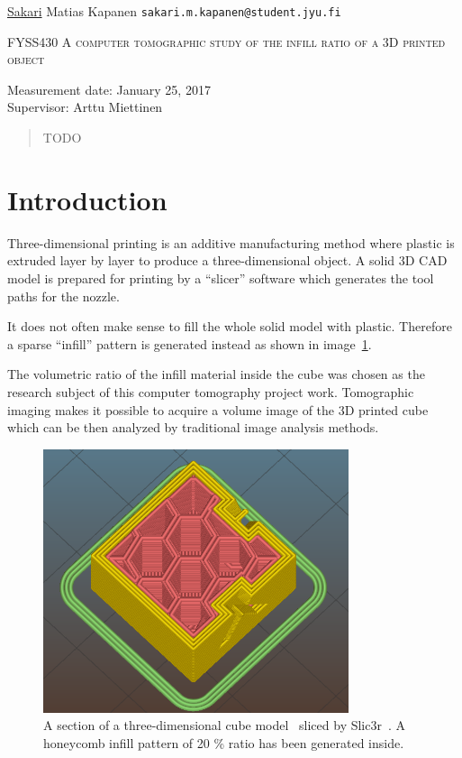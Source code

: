 \documentclass[a4paper,twoside,12pt]{article}
\begin{document}
\onehalfspacing%
\thispagestyle{empty}
\begin{flushleft}
 \underline{Sakari} Matias Kapanen\hfill
 \texttt{sakari.m.kapanen@student.jyu.fi}
\end{flushleft}
\vfill
\begin{center}
\textsc{\LARGE FYSS430 A computer tomographic study of the infill ratio of a 3D printed object}
\end{center}
\vfill
Measurement date: January 25, 2017\\
Supervisor: Arttu Miettinen\\
\vfill
\begin{abstract}
 \noindent
    TODO
\end{abstract}
\clearpage%

\setlength{\parindent}{0pt}  %
\setlength{\parskip}{12pt}  %

\setcounter{page}{1}

\section{Introduction}
Three-dimensional printing is an additive manufacturing method where plastic is extruded layer by layer to produce a three-dimensional object. A solid 3D CAD model is prepared for printing by a ``slicer'' software which generates the tool paths for the nozzle.

It does not often make sense to fill the whole solid model with plastic. Therefore a sparse ``infill'' pattern is generated instead as shown in image~\ref{fig:honeycomb}.

The volumetric ratio of the infill material inside the cube was chosen as the research subject of this computer tomography project work. Tomographic imaging makes it possible to acquire a volume image of the 3D printed cube which can be then analyzed by traditional image analysis methods.

\begin{figure}
    \centering
    \includegraphics[width=0.8\textwidth]{images/cube_slic3r.png}
    \caption{A section of a three-dimensional cube model~\cite{testcube} sliced by Slic3r~\cite{slic3r}. A honeycomb infill pattern of 20 \% ratio has been generated inside.}
    \label{fig:honeycomb}
\end{figure}
\end{document}

